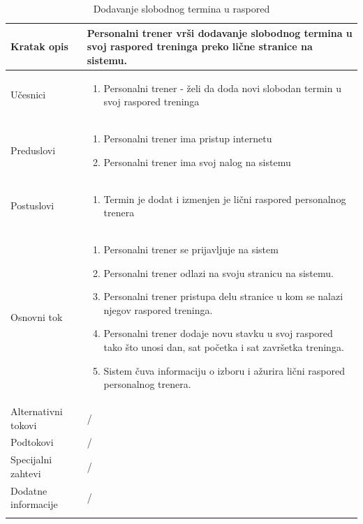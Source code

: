 \begin{longtable}{| p{} | p{} |} 
\hline
    Kratak opis &  Personalni trener vrši dodavanje slobodnog termina u svoj raspored treninga preko lične stranice na sistemu.\\ 
\hline    
    Učesnici &
    \begin{enumerate}
        \item Personalni trener - želi da doda novi slobodan termin u svoj raspored treninga
    \end{enumerate}\\
\hline
   Preduslovi & 
   \begin{enumerate}
        \item Personalni trener ima pristup internetu
        \item Personalni trener ima svoj nalog na sistemu
    \end{enumerate}\\
\hline  
    Postuslovi &
    \begin{enumerate}
        \item Termin je dodat i izmenjen je lični raspored personalnog trenera
    \end{enumerate}\\
\hline
    Osnovni tok & 
    \begin{enumerate}
        \item Personalni trener se prijavljuje na sistem
        \item Personalni trener odlazi na svoju stranicu na sistemu.
        \item Personalni trener pristupa delu stranice u kom se nalazi njegov raspored treninga.
        \item Personalni trener dodaje novu stavku u svoj raspored tako što unosi dan, sat početka i sat završetka treninga.
        \item Sistem čuva informaciju o izboru i ažurira lični raspored personalnog trenera.
    \end{enumerate}\\
\hline
    Alternativni tokovi & /\\
\hline
    Podtokovi & /\\
\hline
    Specijalni zahtevi & /\\
\hline
    Dodatne informacije & /\\
\hline
\caption{Dodavanje slobodnog termina u raspored} %
\end{longtable}





